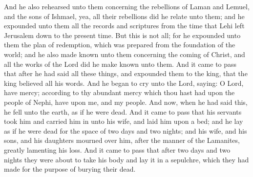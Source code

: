 And he also rehearsed unto them concerning the rebellions of Laman and Lemuel, and the sons of Ishmael, yea, all their rebellions did he relate unto them; and he expounded unto them all the records and scriptures from the time that Lehi left Jerusalem down to the present time.
\bverse \iffalse But this is not all; for he expounded unto them the plan of redemption, which was prepared from the foundation of the world; and he also made known unto them concerning the coming of Christ, and all the works of the Lord did he make known unto them. \fi
But this is not all; for he expounded unto them the plan of redemption, which was prepared from the foundation of the world; and he also made known unto them concerning the coming of Christ, and all the works of the Lord did he make known unto them.
\bverse \iffalse And it came to pass that after he had said all these things, and expounded them to the king, that the king believed all his words. \fi
And it came to pass that after he had said all these things, and expounded them to the king, that the king believed all his words.
\bverse \iffalse And he began to cry unto the Lord, saying: O Lord, have mercy; according to thy abundant mercy which thou hast had upon the people of Nephi, have upon me, and my people. \fi
And he began to cry unto the Lord, saying: O Lord, have mercy; according to thy abundant mercy which thou hast had upon the people of Nephi, have upon me, and my people.
\bverse \iffalse And now, when he had said this, he fell unto the earth, as if he were dead. \fi
And now, when he had said this, he fell unto the earth, as if he were dead.
\bverse \iffalse And it came to pass that his servants took him and carried him in unto his wife, and laid him upon a bed; and he lay as if he were dead for the space of two days and two nights; and his wife, and his sons, and his daughters mourned over him, after the manner of the Lamanites, greatly lamenting his loss. \fi
And it came to pass that his servants took him and carried him in unto his wife, and laid him upon a bed; and he lay as if he were dead for the space of two days and two nights; and his wife, and his sons, and his daughters mourned over him, after the manner of the Lamanites, greatly lamenting his loss.
\bchapter
\bverse \iffalse And it came to pass that after two days and two nights they were about to take his body and lay it in a sepulchre, which they had made for the purpose of burying their dead. \fi
And it came to pass that after two days and two nights they were about to take his body and lay it in a sepulchre, which they had made for the purpose of burying their dead.
